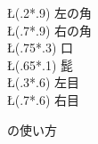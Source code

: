 \begin{figure}[htbp]
\begin{minipage}{.49\linewidth}
  \T\L(.2*.9) 左の角\\
  \T\L(.7*.9) 右の角\\ 
  \T\L(.75*.3)  口\\ 
  \T\L(.65*.1) 髭\\ 
  \T\L(.3*.6) 左目\\ 
  \T\L(.7*.6)  右目\\ 
  \endSetLabels
  \strut{}%
\end{minipage}
 \caption{ の使い方\label{fig:labelfig}}%
\end{figure}


